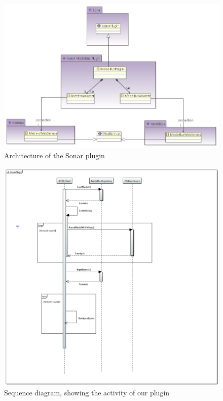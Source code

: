 \begin{figure}[!htbp]
\centering
\includegraphics[width=\textwidth]{architecture}
\caption{Architecture of the Sonar plugin}
\label{fig:architecture}
\end{figure}

\begin{figure}[!htbp]
\centering
\includegraphics[width=\textwidth]{sequencediagramm}
\caption{Sequence diagram, showing the activity of our plugin}
\label{fig:sequence}
\end{figure}

